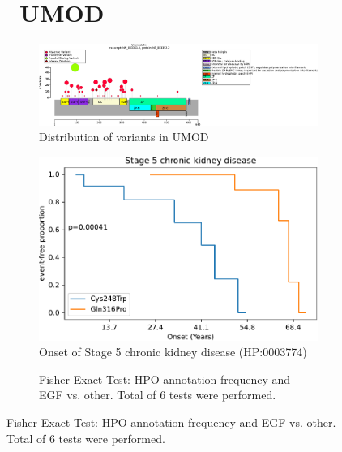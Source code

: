 \begin{figure}[htbp]
\section*{ UMOD}
\centering
\begin{subfigure}[b]{0.45\textwidth}
\centering
\includegraphics[width=\textwidth]{img/UMOD_protein_diagram.pdf} 
\captionsetup{justification=raggedright,singlelinecheck=false}
\caption{Distribution of variants in UMOD}
\end{subfigure}
\begin{subfigure}[b]{0.45\textwidth}
\centering
\includegraphics[width=\textwidth]{ img/UMOD_stats.pdf} 
\captionsetup{justification=raggedright,singlelinecheck=false}
\caption{Onset of
Stage 5 chronic kidney disease (HP:0003774)}
\end{subfigure}

\vspace{1em}

\begin{subfigure}[b]{0.95\textwidth}
\centering
{}
\captionsetup{justification=raggedright,singlelinecheck=false}
\caption{Fisher Exact Test: HPO annotation frequency and EGF vs. other. Total of 6 tests were performed. }
\end{subfigure}


\end{figure}
